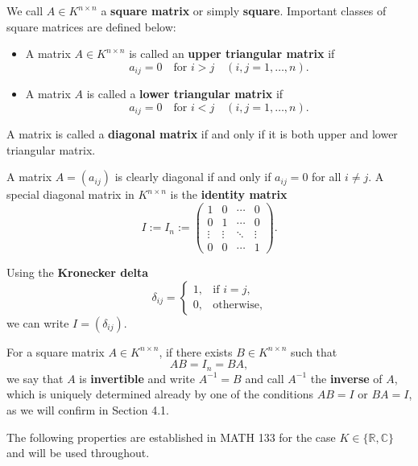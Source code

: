 \documentclass{tufte-handout}
\begin{document}
We call $A \in K^{n \times n}$ a \textbf{square matrix} or simply \textbf{square}. Important classes of square matrices are defined below:
\begin{itemize}
    \item A matrix $A \in K^{n \times n}$ is called an \textbf{upper triangular matrix} if 
    \[
    a_{ij} = 0 \quad \text{for } i > j \quad (i, j = 1, \ldots, n).
    \]
    \item A matrix $A$ is called a \textbf{lower triangular matrix} if 
    \[
    a_{ij} = 0 \quad \text{for } i < j \quad (i, j = 1, \ldots, n).
    \]
\end{itemize}

A matrix is called a \textbf{diagonal matrix} if and only if it is both upper and lower triangular matrix.


A matrix $A = (a_{ij})$ is clearly diagonal if and only if $a_{ij} = 0$ for all $i \neq j$. A special diagonal matrix in $K^{n \times n}$ is the \textbf{identity matrix}
\[
I := I_n :=
\begin{pmatrix}
1 & 0 & \cdots & 0 \\
0 & 1 & \cdots & 0 \\
\vdots & \vdots & \ddots & \vdots \\
0 & 0 & \cdots & 1
\end{pmatrix}.
\]

Using the \textbf{Kronecker delta}
\[
\delta_{ij} =
\begin{cases}
1, & \text{if } i = j, \\
0, & \text{otherwise},
\end{cases}
\]
we can write $I = (\delta_{ij})$.

For a square matrix $A \in K^{n \times n}$, if there exists $B \in K^{n \times n}$ such that
\[
AB = I_n = BA,
\]
we say that $A$ is \textbf{invertible} and write $A^{-1} = B$ and call $A^{-1}$ the \textbf{inverse} of $A$, which is uniquely determined already by one of the conditions $AB = I$ or $BA = I$, as we will confirm in Section 4.1.

The following properties are established in MATH 133 for the case $K \in \{\mathbb{R}, \mathbb{C}\}$ and will be used throughout.
\end{document}
